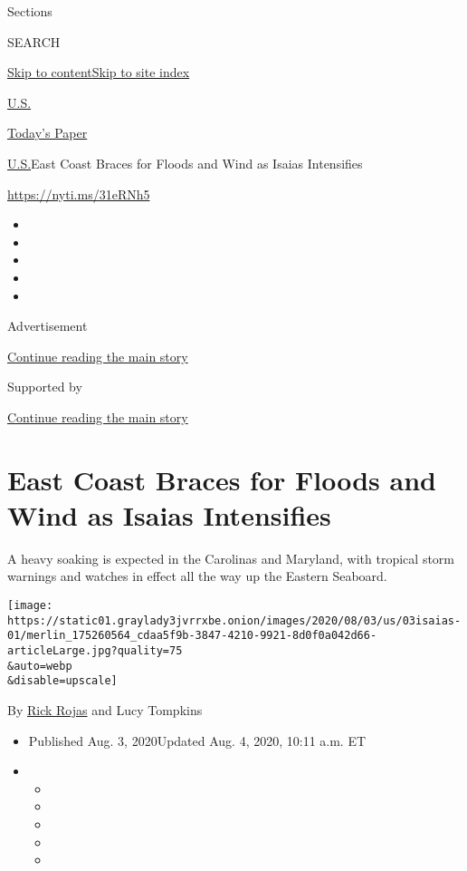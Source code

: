 Sections

SEARCH

\protect\hyperlink{site-content}{Skip to
content}\protect\hyperlink{site-index}{Skip to site index}

\href{https://www.nytimes3xbfgragh.onion/section/us}{U.S.}

\href{https://myaccount.nytimes3xbfgragh.onion/auth/login?response_type=cookie\&client_id=vi}{}

\href{https://www.nytimes3xbfgragh.onion/section/todayspaper}{Today's
Paper}

\href{/section/us}{U.S.}\textbar{}East Coast Braces for Floods and Wind
as Isaias Intensifies

\url{https://nyti.ms/31eRNh5}

\begin{itemize}
\item
\item
\item
\item
\item
\end{itemize}

Advertisement

\protect\hyperlink{after-top}{Continue reading the main story}

Supported by

\protect\hyperlink{after-sponsor}{Continue reading the main story}

\hypertarget{east-coast-braces-for-floods-and-wind-as-isaias-intensifies}{%
\section{East Coast Braces for Floods and Wind as Isaias
Intensifies}\label{east-coast-braces-for-floods-and-wind-as-isaias-intensifies}}

A heavy soaking is expected in the Carolinas and Maryland, with tropical
storm warnings and watches in effect all the way up the Eastern
Seaboard.

\texttt{[image: https://static01.graylady3jvrrxbe.onion/images/2020/08/03/us/03isaias-01/merlin\_175260564\_cdaa5f9b-3847-4210-9921-8d0f0a042d66-articleLarge.jpg?quality=75\\\&auto=webp\\\&disable=upscale]}

By \href{https://www.nytimes3xbfgragh.onion/by/rick-rojas}{Rick Rojas}
and Lucy Tompkins

\begin{itemize}
\item
  Published Aug. 3, 2020Updated Aug. 4, 2020, 10:11 a.m. ET
\item
  \begin{itemize}
  \item
  \item
  \item
  \item
  \item
  \end{itemize}
\end{itemize}

